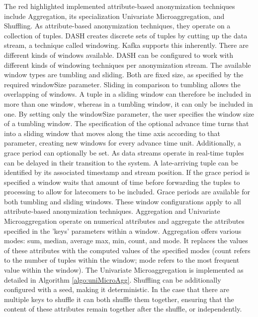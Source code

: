 The red highlighted implemented attribute-based anonymization techniques include Aggregation, its specialization Univariate Microaggregation, and Shuffling. As attribute-based anonymization techniques, they operate on a collection of tuples. \ac{DASH} creates discrete sets of tuples by cutting up the data stream, a technique called windowing. Kafka supports this inherently. There are different kinds of windows available. \ac{DASH} can be configured to work with different kinds of windowing techniques per anonymization stream. The available window types are tumbling and sliding. Both are fixed size, as specified by the required windowSize parameter. Sliding in comparison to tumbling allows the overlapping of windows. A tuple in a sliding window can therefore be included in more than one window, whereas in a tumbling window, it can only be included in one. By setting only the windowSize parameter, the user specifies the window size of a tumbling window. The specification of the optional advance time turns that into a sliding window that moves along the time axis according to that parameter, creating new windows for every advance time unit. Additionally, a grace period can optionally be set. As data streams operate in real-time tuples can be delayed in their transition to the system. A late-arriving tuple can be identified by its associated timestamp and stream position. If the grace period is specified a window waits that amount of time before forwarding the tuples to processing to allow for latecomers to be included. Grace periods are available for both tumbling and sliding windows. These window configurations apply to all attribute-based anonymization techniques. Aggregation and Univariate Microaggregation operate on numerical attributes and aggregate the attributes specified in the 'keys' parameters within a window. Aggregation offers various modes: sum, median, average max, min, count, and mode. It replaces the values of these attributes with the computed values of the specified modes (count refers to the number of tuples within the window; mode refers to the most frequent value within the window). The Univariate Microaggregation is implemented as detailed in Algorithm \ref{algo:uniMicroAgg}. Shuffling can be additionally configured with a seed, making it deterministic. In the case that there are multiple keys to shuffle it can both shuffle them together, ensuring that the content of these attributes remain together after the shuffle, or independently. \par
